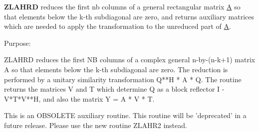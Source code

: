{\bfseries Z\+L\+A\+H\+R\+D} reduces the first nb columns of a general rectangular matrix \hyperlink{classA}{A} so that elements below the k-\/th subdiagonal are zero, and returns auxiliary matrices which are needed to apply the transformation to the unreduced part of \hyperlink{classA}{A}. 

 \begin{DoxyParagraph}{Purpose\+: }
\begin{DoxyVerb} ZLAHRD reduces the first NB columns of a complex general n-by-(n-k+1)
 matrix A so that elements below the k-th subdiagonal are zero. The
 reduction is performed by a unitary similarity transformation
 Q**H * A * Q. The routine returns the matrices V and T which determine
 Q as a block reflector I - V*T*V**H, and also the matrix Y = A * V * T.

 This is an OBSOLETE auxiliary routine. 
 This routine will be 'deprecated' in a  future release.
 Please use the new routine ZLAHR2 instead.\end{DoxyVerb}
 
\end{DoxyParagraph}

